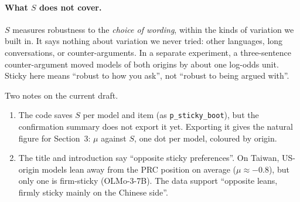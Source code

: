 \documentclass[11pt]{article}
\newcommand{\1}{\mathbbm{1}}
\begin{document}
\paragraph{What $S$ does not cover.} $S$ measures robustness to the
\emph{choice of wording}, within the kinds of variation we built in. It says
nothing about variation we never tried: other languages, long conversations,
or counter-arguments. In a separate experiment, a three-sentence
counter-argument moved models of both origins by about one log-odds unit.
Sticky here means ``robust to how you ask'', not ``robust to being argued
with''.

\begin{draftnote}\small
Two notes on the current draft.
\begin{enumerate}[leftmargin=1.4em,itemsep=1pt]
  \item The code saves $S$ per model and item (as \texttt{p\_sticky\_boot}),
        but the confirmation summary does not export it yet. Exporting it
        gives the natural figure for Section~3: $\mu$ against $S$, one dot per
        model, coloured by origin.
  \item The title and introduction say ``opposite sticky preferences''. On
        Taiwan, US-origin models lean away from the PRC position on average
        ($\mu\approx-0.8$), but only one is firm-sticky (OLMo-3-7B). The data
        support ``opposite leans, firmly sticky mainly on the Chinese side''.
\end{enumerate}
\end{draftnote}
\end{document}
